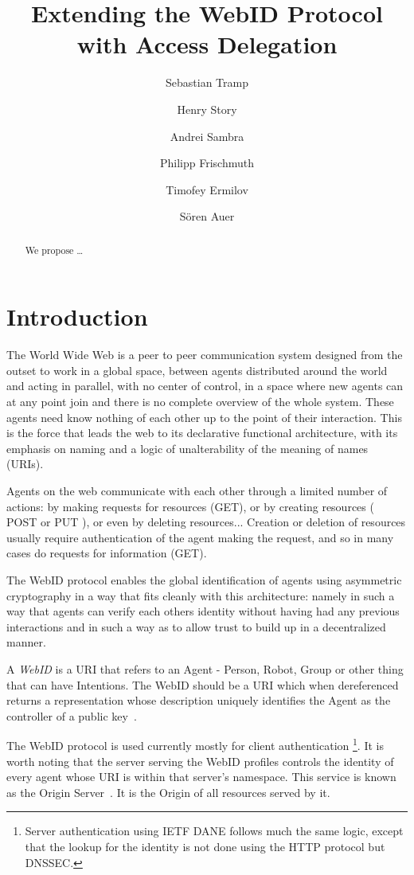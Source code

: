 \documentclass[a4paper]{llncs}
\title{Extending the WebID Protocol with Access Delegation}
\author{Sebastian Tramp\inst{1} \and Henry Story\inst{2} \and Andrei Sambra\inst{3} \and Philipp Frischmuth\inst{1} \and Timofey Ermilov\inst{1} \and S\"oren Auer\inst{1}}
\institute{
Universit\"at Leipzig, Institut f\"ur Informatik, AKSW,\\
Postfach 100920, D-04009 Leipzig, Germany,\\
\email{\{lastname\}@informatik.uni-leipzig.de}\\
\url{http://aksw.org/FirstnameLastname} (WebID)
\medskip\and
Apache Foundation\\ 
\email{henry.story@bblfish.net}\\
\url{http://bblfish.net/people/henry/card\#me} (WebID)
\medskip\and
CNRS Samovar UMR 5157, TELECOM SudParis\\
\email{andrei.sambra@it-sudparis.eu}\\
\url{https://my-profile.eu/people/deiu/card\#me} (WebID)
}
\begin{document}
\maketitle              %

\begin{abstract}
We propose \ldots
\end{abstract}

\section{Introduction}\label{sec:intro}

The World Wide Web is a peer to peer communication system designed from the outset to work in a global space, between agents distributed around the world and acting in parallel, with no center of control, in a space where new agents can at any point join and there is no complete overview of the whole system.
These agents need know nothing of each other up to the point of their interaction.
This is the force that leads the web to its declarative functional architecture, with its emphasis on naming and a logic of unalterability of the meaning of names (URIs).  
  
Agents on the web communicate with each other through a limited number of actions: by making requests for resources (GET), or by creating resources ( POST or PUT ), or even by deleting resources...
Creation or deletion of resources usually require authentication of the agent making the request, and so in many cases do requests for information (GET). 

The WebID protocol enables the global identification of agents using asymmetric cryptography in a way that fits cleanly with this architecture: namely in such a way that agents can verify each others identity without having had any previous interactions and in such a way as to allow trust to build up in a decentralized manner.

A \textit{WebID} is a URI that refers to an Agent - Person, Robot, Group or other thing that can have Intentions.
The WebID should be a URI which when dereferenced returns a representation whose description uniquely identifies the Agent as the controller of a public key~\cite{sporny-m-2011--a}.

The WebID protocol is used currently mostly for client authentication%
\footnote{Server authentication using IETF DANE follows much the same logic, except that the lookup for the identity is not done using the HTTP protocol but DNSSEC.}.
It is worth noting that the server serving the WebID profiles controls the identity of every agent whose URI is within that server's namespace.
This service is known as the Origin Server~\cite{barth-a-2011--a}.
It is the Origin of all resources served by it. 
\end{document}
